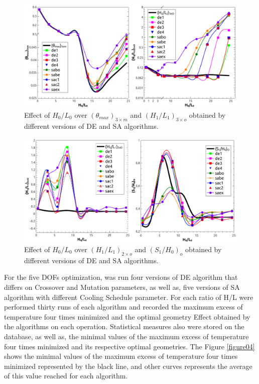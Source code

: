 \documentclass[12pt,fleqn]{article}
\begin{document}
\begin{figure}[H]
\centering
\includegraphics[width=1\linewidth]{imgs/4dof/de_sa_h0l0-tmin-4dof.png}
\caption{ {\small Effect of $H_{0}/L_{0}$ over $({\theta}_{max})_{3\times m}$ and $(H_{1}/L_{1})_{3\times o}$ obtained by different versions of DE and SA algorithms.}}
\label{figure02}
\end{figure}


\begin{figure}[H]
\centering
\includegraphics[width=1\linewidth]{imgs/4dof/de_sa_h0l0-h1l1-s1h0-4dof.png}
\caption{ {\small Effect of $H_{0}/L_{0}$ over $(H_{1}/L_{1})_{2\times o}$ and $(S_{1}/H_{0})_{o}$ obtained by different versions of DE and SA algorithms.}}
\label{figure03}
\end{figure}

For the five DOFs optimization, was run four versions of DE algorithm that differs on Crossover and Mutation parameters, as well as, five versions of SA algorithm with different Cooling Schedule parameter. For each ratio of H/L were performed thirty runs of each algorithm and recorded the maximum excess of temperature four times minimized and the optimal geometry Effect obtained by the algorithms on each operation. Statistical measures also were stored on the database, as well as, the minimal values of the maximum excess of temperature four times minimized and its respective optimal geometries. The Figure \ref{figure04} shows  the minimal values of the maximum excess of temperature four times minimized represented by the black line, and other curves represents the average of this value reached for each algorithm. 
\end{document}
